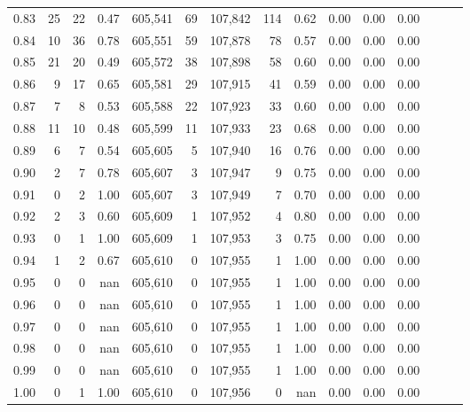\begin{tabular}{rrrrrrrrrrrrrrr}
0.83 &      25 &     22 &  0.47 &  605,541 &       69 &  107,842 &      114 &  0.62 &  0.00 &  0.00 &      0.00 \\
0.84 &      10 &     36 &  0.78 &  605,551 &       59 &  107,878 &       78 &  0.57 &  0.00 &  0.00 &      0.00 \\
0.85 &      21 &     20 &  0.49 &  605,572 &       38 &  107,898 &       58 &  0.60 &  0.00 &  0.00 &      0.00 \\
0.86 &       9 &     17 &  0.65 &  605,581 &       29 &  107,915 &       41 &  0.59 &  0.00 &  0.00 &      0.00 \\
0.87 &       7 &      8 &  0.53 &  605,588 &       22 &  107,923 &       33 &  0.60 &  0.00 &  0.00 &      0.00 \\
0.88 &      11 &     10 &  0.48 &  605,599 &       11 &  107,933 &       23 &  0.68 &  0.00 &  0.00 &      0.00 \\
0.89 &       6 &      7 &  0.54 &  605,605 &        5 &  107,940 &       16 &  0.76 &  0.00 &  0.00 &      0.00 \\
0.90 &       2 &      7 &  0.78 &  605,607 &        3 &  107,947 &        9 &  0.75 &  0.00 &  0.00 &      0.00 \\
0.91 &       0 &      2 &  1.00 &  605,607 &        3 &  107,949 &        7 &  0.70 &  0.00 &  0.00 &      0.00 \\
0.92 &       2 &      3 &  0.60 &  605,609 &        1 &  107,952 &        4 &  0.80 &  0.00 &  0.00 &      0.00 \\
0.93 &       0 &      1 &  1.00 &  605,609 &        1 &  107,953 &        3 &  0.75 &  0.00 &  0.00 &      0.00 \\
0.94 &       1 &      2 &  0.67 &  605,610 &        0 &  107,955 &        1 &  1.00 &  0.00 &  0.00 &      0.00 \\
0.95 &       0 &      0 &   nan &  605,610 &        0 &  107,955 &        1 &  1.00 &  0.00 &  0.00 &      0.00 \\
0.96 &       0 &      0 &   nan &  605,610 &        0 &  107,955 &        1 &  1.00 &  0.00 &  0.00 &      0.00 \\
0.97 &       0 &      0 &   nan &  605,610 &        0 &  107,955 &        1 &  1.00 &  0.00 &  0.00 &      0.00 \\
0.98 &       0 &      0 &   nan &  605,610 &        0 &  107,955 &        1 &  1.00 &  0.00 &  0.00 &      0.00 \\
0.99 &       0 &      0 &   nan &  605,610 &        0 &  107,955 &        1 &  1.00 &  0.00 &  0.00 &      0.00 \\
1.00 &       0 &      1 &  1.00 &  605,610 &        0 &  107,956 &        0 &   nan &  0.00 &  0.00 &      0.00 \\
\bottomrule
\end{tabular}
